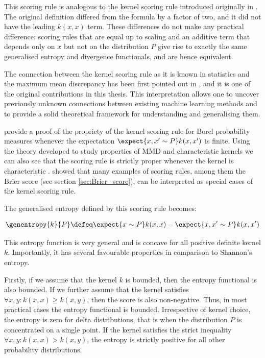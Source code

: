 This scoring rule is analogous to the kernel scoring rule introduced originally in \citep{DawidAncientpaper}. The original definition differed from the formula by a factor of two, and it did not have the leading $k(x,x)$ term. These differences do not make any practical difference: scoring rules that are equal up to scaling and an additive term that depends only on $x$ but not on the distribution $P$ give rise to exactly the same generalised entropy and divergence functionals, and are hence equivalent.

The connection between the kernel scoring rule as it is known in statistics and the maximum mean discrepancy has been first pointed out in \citep{HuszarDuvenaud2012}, and it is one of the original contributions in this thesis. This interpretation allows one to uncover previously unknown connections between existing machine learning methods and to provide a solid theoretical framework for understanding and generalising them.

\citep{Gneiting2007} provide a proof of the propriety of the kernel scoring rule for Borel probability measures whenever the expectation $\expect{x,x'\sim P} k(x,x')$ is finite. Using the theory developed to study properties of MMD and characteristic kernels we can also see that the scoring rule is strictly proper whenever the kernel is characteristic \citep{Sripedimbudur}. \citep{Gneiting2007} showed that many examples of scoring rules, among them the Brier score (see section \ref{sec:Brier_score}), can be interpreted as special cases of the kernel scoring rule.

The generalised entropy defined by this scoring rule becomes:

\begin{equation}
	\genentropy{k}{P} \defeq \expect{x\sim P} k(x,x) - \expect{x,x'\sim P} k(x,x')
\end{equation}

This entropy function is very general and is concave for all positive definite kernel $k$. Importantly, it has several favourable properties in comparison to Shannon's entropy.

Firstly, if we assume that the kernel $k$ is bounded, then the entropy functional is also bounded. If we further assume that the kernel satisfies $\forall x,y: k(x,x)\geq k(x,y)$, then the score is also non-negative. Thus, in most practical cases the entropy functional is bounded. Irrespective of kernel choice, the entropy is zero for delta distributions, that is when the distribution $P$ is concentrated on a single point. If the kernel satisfies the strict inequality $\forall x,y: k(x,x) > k(x,y)$, the entropy is strictly positive for all other probability distributions.

